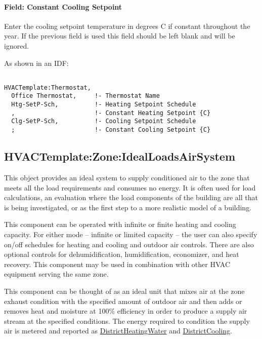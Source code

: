 \paragraph{Field: Constant Cooling Setpoint}\label{field-constant-cooling-setpoint}

Enter the cooling setpoint temperature in degrees C if constant throughout the year. If the previous field is used this field should be left blank and will be ignored.

As shown in an IDF:

\begin{lstlisting}

HVACTemplate:Thermostat,
  Office Thermostat,     !- Thermostat Name
  Htg-SetP-Sch,          !- Heating Setpoint Schedule
  ,                      !- Constant Heating Setpoint {C}
  Clg-SetP-Sch,          !- Cooling Setpoint Schedule
  ;                      !- Constant Cooling Setpoint {C}
\end{lstlisting}

\subsection{HVACTemplate:Zone:IdealLoadsAirSystem}\label{hvactemplatezoneidealloadsairsystem}

This object provides an ideal system to supply conditioned air to the zone that meets all the load requirements and consumes no energy. It is often used for load calculations, an evaluation where the load components of the building are all that is being investigated, or as the first step to a more realistic model of a building.

This component can be operated with infinite or finite heating and cooling capacity. For either mode -- infinite or limited capacity -- the user can also specify on/off schedules for heating and cooling and outdoor air controls. There are also optional controls for dehumidification, humidification, economizer, and heat recovery. This component may be used in combination with other HVAC equipment serving the same zone.

This component can be thought of as an ideal unit that mixes air at the zone exhaust condition with the specified amount of outdoor air and then adds or removes heat and moisture at 100\% efficiency in order to produce a supply air stream at the specified conditions. The energy required to condition the supply air is metered and reported as \hyperref[districtheating]{DistrictHeatingWater} and \hyperref[districtcooling]{DistrictCooling}.

